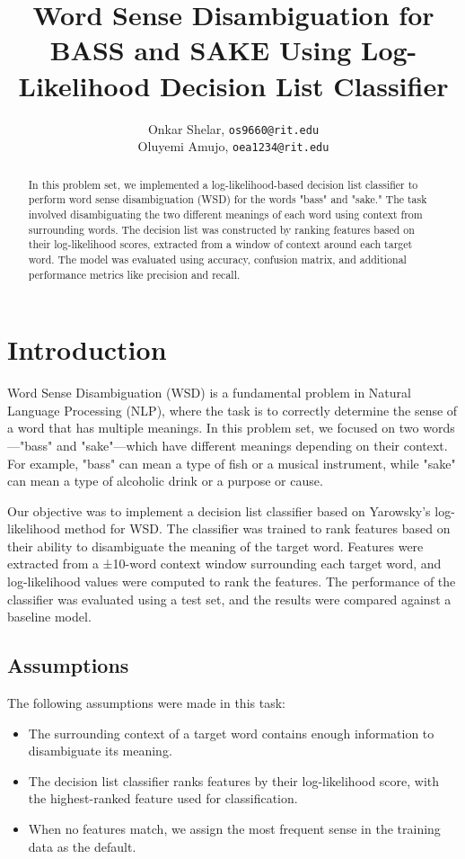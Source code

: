 \documentclass[journal,onecolumn]{IEEEtran}
\title{Word Sense Disambiguation for BASS and SAKE Using Log-Likelihood Decision List Classifier}
\author{
    Onkar Shelar, \texttt{os9660@rit.edu}\\
    Oluyemi Amujo, \texttt{oea1234@rit.edu}
}
\begin{document}
\maketitle

\begin{abstract}
In this problem set, we implemented a log-likelihood-based decision list classifier to perform word sense disambiguation (WSD) for the words "bass" and "sake." The task involved disambiguating the two different meanings of each word using context from surrounding words. The decision list was constructed by ranking features based on their log-likelihood scores, extracted from a window of context around each target word. The model was evaluated using accuracy, confusion matrix, and additional performance metrics like precision and recall.
\end{abstract}

\section{Introduction}
Word Sense Disambiguation (WSD) is a fundamental problem in Natural Language Processing (NLP), where the task is to correctly determine the sense of a word that has multiple meanings. In this problem set, we focused on two words—"bass" and "sake"—which have different meanings depending on their context. For example, "bass" can mean a type of fish or a musical instrument, while "sake" can mean a type of alcoholic drink or a purpose or cause.

Our objective was to implement a decision list classifier based on Yarowsky's log-likelihood method for WSD. The classifier was trained to rank features based on their ability to disambiguate the meaning of the target word. Features were extracted from a ±10-word context window surrounding each target word, and log-likelihood values were computed to rank the features. The performance of the classifier was evaluated using a test set, and the results were compared against a baseline model.

\subsection{Assumptions}
The following assumptions were made in this task:
\begin{itemize}
    \item The surrounding context of a target word contains enough information to disambiguate its meaning.
    \item The decision list classifier ranks features by their log-likelihood score, with the highest-ranked feature used for classification.
    \item When no features match, we assign the most frequent sense in the training data as the default.
\end{itemize}
\end{document}
